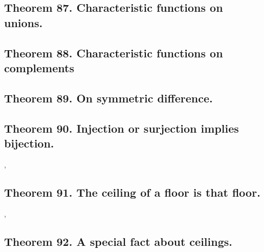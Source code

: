\documentclass[preview]{standalone}
\begin{document}
\subsection[Characteristic functions on unions.]
    {
        \color{section}Theorem 87. \color{black} Characteristic functions on unions.
    }

\pagebreak


\subsection[Characteristic functions on a complement.]
    {
        \color{section}Theorem 88. \color{black} Characteristic functions on complements
    }

\pagebreak


\subsection[Characteristic functions on symmetric difference.]
    {
        \color{section}Theorem 89. \color{black} On symmetric difference.
    }



\subsection[With equal cardinality, injection or surjection implies bijection.]
    {
        \color{section}Theorem 90. \color{black} Injection or surjection implies bijection.
    }

\sep


\subsection[The ceiling of a floor is that floor.]
    {
        \color{section}Theorem 91. \color{black} The ceiling of a floor is that floor.
    }

\sep
\pagebreak


\subsection[A special fact about ceilings.]
    {
        \color{section}Theorem 92. \color{black} A special fact about ceilings.
    }

\pagebreak
\end{document}
